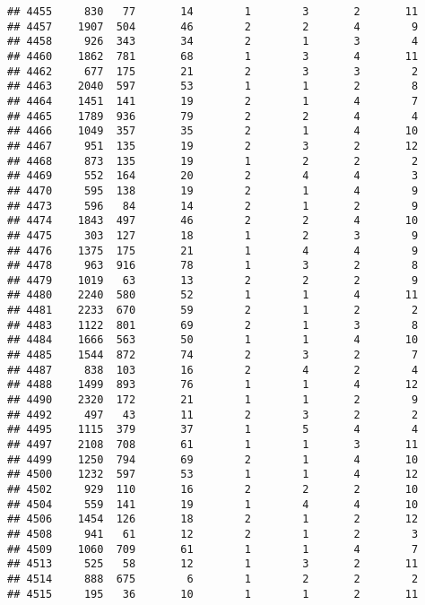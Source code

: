 \documentclass[]{article}
\begin{document}
\begin{verbatim}
## 4455     830   77       14        1        3       2       11
## 4457    1907  504       46        2        2       4        9
## 4458     926  343       34        2        1       3        4
## 4460    1862  781       68        1        3       4       11
## 4462     677  175       21        2        3       3        2
## 4463    2040  597       53        1        1       2        8
## 4464    1451  141       19        2        1       4        7
## 4465    1789  936       79        2        2       4        4
## 4466    1049  357       35        2        1       4       10
## 4467     951  135       19        2        3       2       12
## 4468     873  135       19        1        2       2        2
## 4469     552  164       20        2        4       4        3
## 4470     595  138       19        2        1       4        9
## 4473     596   84       14        2        1       2        9
## 4474    1843  497       46        2        2       4       10
## 4475     303  127       18        1        2       3        9
## 4476    1375  175       21        1        4       4        9
## 4478     963  916       78        1        3       2        8
## 4479    1019   63       13        2        2       2        9
## 4480    2240  580       52        1        1       4       11
## 4481    2233  670       59        2        1       2        2
## 4483    1122  801       69        2        1       3        8
## 4484    1666  563       50        1        1       4       10
## 4485    1544  872       74        2        3       2        7
## 4487     838  103       16        2        4       2        4
## 4488    1499  893       76        1        1       4       12
## 4490    2320  172       21        1        1       2        9
## 4492     497   43       11        2        3       2        2
## 4495    1115  379       37        1        5       4        4
## 4497    2108  708       61        1        1       3       11
## 4499    1250  794       69        2        1       4       10
## 4500    1232  597       53        1        1       4       12
## 4502     929  110       16        2        2       2       10
## 4504     559  141       19        1        4       4       10
## 4506    1454  126       18        2        1       2       12
## 4508     941   61       12        2        1       2        3
## 4509    1060  709       61        1        1       4        7
## 4513     525   58       12        1        3       2       11
## 4514     888  675        6        1        2       2        2
## 4515     195   36       10        1        1       2       11

\end{verbatim}
\end{document}
